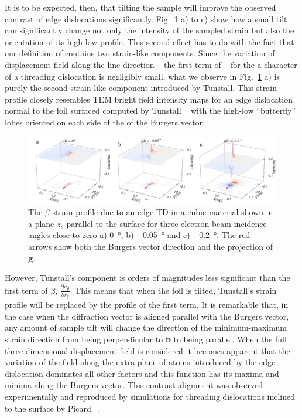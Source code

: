 It is to be expected, then, that tilting the sample will improve the observed contrast of edge dislocations significantly. Fig.~\ref{fig:tilting_eff}  a) to c) show how a small tilt can significantly change not only the intensity of the sampled strain but also the orientation of its high-low profile. This second effect has to do with the fact that our definition of contains two strain-like components. Since the variation of displacement field along the line direction – the first term of – for the a character of a threading dislocation is negligibly small, what we observe in Fig.~\ref{fig:tilting_eff} a) is purely the second strain-like component introduced by Tunstall. This strain profile closely resembles TEM bright field intensity maps for an edge dislocation normal to the foil surfaced computed by Tunstall \etal~\cite{Tunstall64}  with the high-low
``butterfly'' lobes oriented on each side of the of the Burgers vector.

\begin{figure}
    \centering
    \includegraphics[width=1.1\linewidth]{Figures/tilting_effect.png}
    \caption[Planar edge TD $\beta$ strain profile. ]{The $\beta$ strain profile due to an edge TD in a cubic material shown in a plane $z_s$ parallel to the surface for three electron beam incidence angles close to zero a) \SI{0}{\degree}, b) \SI{-0.05}{\degree} and c) \SI{-0.2}{\degree}. The red arrows show both the Burgers vector direction and the projection of \textbf{g}.}
    \label{fig:tilting_eff}
\end{figure}

However, Tunstall’s component is orders of magnitudes less significant than the first term of $\beta$, $\frac{\partial u_g}{\partial r_{g}}$. This means that when the foil is tilted, Tunstall’s strain profile will be replaced by the profile of the first term. It is remarkable that, in the case when the diffraction vector is aligned parallel with the Burgers vector, any amount of sample tilt will change the direction of the minimum-maximum strain direction from being perpendicular to \textbf{b} to being parallel.
When the full three dimensional displacement field is considered it becomes apparent that the variation of the field
along the extra plane of atoms introduced by the edge dislocation dominates all other factors and this function has its
maxima and minima along the Burgers vector. This contrast alignment was observed experimentally and reproduced
by simulations for threading dislocations inclined to the surface by Picard \etal~\cite{Picard}.

